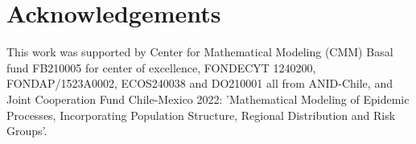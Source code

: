 \documentclass{article}
\begin{document}
\section*{Acknowledgements}
This work was supported by Center for Mathematical Modeling (CMM) Basal fund FB210005 for center of excellence, FONDECYT 1240200, FONDAP/1523A0002, ECOS240038 and DO210001 all from ANID-Chile, and Joint Cooperation Fund Chile-Mexico 2022: 'Mathematical
Modeling of Epidemic Processes, Incorporating Population Structure, Regional Distribution and
Risk Groups'.


\end{document}
